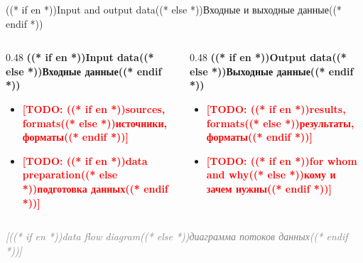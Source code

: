 \documentclass[aspectratio=169, 14pt]{beamer}
\newcommand{\todo}[1]{\textcolor{red}{\textbf{[TODO: #1]}}}
\begin{document}
\begin{frame}{((* if en *))Input and output data((* else *))Входные и выходные данные((* endif *))}
  \begin{columns}[T]
    \begin{column}{0.48\textwidth}
      {\color{hseblue}\textbf{((* if en *))Input data((* else *))Входные данные((* endif *))}}
      \begin{itemize}
        \item \todo{((* if en *))sources, formats((* else *))источники, форматы((* endif *))}
        \item \todo{((* if en *))data preparation((* else *))подготовка данных((* endif *))}
      \end{itemize}
    \end{column}
    \begin{column}{0.48\textwidth}
      {\color{hseblue}\textbf{((* if en *))Output data((* else *))Выходные данные((* endif *))}}
      \begin{itemize}
        \item \todo{((* if en *))results, formats((* else *))результаты, форматы((* endif *))}
        \item \todo{((* if en *))for whom and why((* else *))кому и зачем нужны((* endif *))}
      \end{itemize}
    \end{column}
  \end{columns}

  \vspace{0.5em}
  \begin{center}
    \textcolor{gray}{\itshape [((* if en *))data flow diagram((* else *))диаграмма потоков данных((* endif *))]}
  \end{center}
\end{frame}
\end{document}
